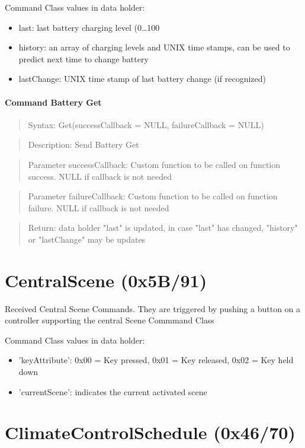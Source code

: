 Command Class values in data holder:
\begin{itemize}
\item last: last battery charging level (0…100 %
\item history: an array of charging levels and UNIX time stamps, can be used to predict next time to change battery
\item lastChange: UNIX time stamp of last battery change (if recognized)
\end{itemize}

\paragraph {Command Battery Get}
\begin{quote} Syntax: Get(successCallback = NULL, failureCallback = NULL)\end{quote}
\begin{quote} Description: Send Battery Get\end{quote}
\begin{quote} Parameter successCallback: Custom function to be called on function success. NULL if callback is not needed\end{quote}
\begin{quote} Parameter failureCallback: Custom function to be called on function failure. NULL if callback is not needed\end{quote}
\begin{quote} Return: data holder "last" is updated, in case "last" has changed, "history" or "lastChange" may be updates\end{quote}


\section{CentralScene (0x5B/91)}		

Received Central Scene Commands. They are triggered by pushing a button on a controller
supporting the central Scene Commmand Class

Command Class values in data holder:
\begin{itemize}
\item 'keyAttribute': 0x00 = Key pressed, 0x01 = Key released, 0x02 = Key held down
\item 'currentScene': indicates the current activated scene
\end{itemize}

\section{ClimateControlSchedule (0x46/70)}	 

